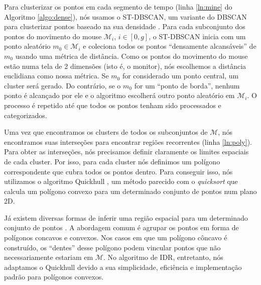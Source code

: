 Para clusterizar os pontos em cada segmento de tempo (linha \ref{ln:mine} do Algoritmo \ref{algo:dense}), nós usamos o ST-DBSCAN, um variante do DBSCAN para clusterizar pontos baseado na sua densidade \cite{Birant:2007}. Para cada subconjunto dos pontos do movimento do mouse $\mathcal{M}_i$, $i \in [0,g]$, o ST-DBSCAN inicia com um ponto aleatório $m_0 \in \mathcal{M}_i$ e coleciona todos os pontos ``densamente alcansáveis'' de $m_0$ usando uma métrica de distância. Como os pontos do movimento do mouse estão numa tela de 2 dimensões (isto é, o monitor), nós escolhemos a distância euclidiana como nossa métrica. Se $m_0$ for considerado um ponto central,  um cluster será gerado. Do contrário, se o $m_0$ for um ``ponto de borda'', nenhum ponto é alcançado por ele e o algoritmo escolherá outro ponto aleatório em $\mathcal{M}_i$. O processo é repetido até que todos os pontos tenham sido processados e categorizados.

Uma vez que encontramos os clusters de todos os subconjuntos de $\mathcal{M}$, nós encontramos suas interseções para encontrar regiões recorrentes (linha \ref{ln:poly}). Para obter as interseções, nós precisamos definir claramente os limites espaciais de cada cluster. Por isso, para cada cluster nós definimos um polígono correspondente que cubra todos os pontos dentro. Para conseguir isso, nós utilizamos o algoritmo Quickhull \cite{Barber:1996}, um método parecido com o \textit{quicksort} que calcula um polígono convexo para um determinado conjunto de pontos num plano 2D.

Já existem diversas formas de inferir uma região espacial para um determinado conjunto de pontos \cite{Bevis1989,DUCKHAM2008,FADILI2004,ARAMPATZIS2006,Galton2006}. A abordagem comum é agrupar os pontos em forma de polígonos concavos e convexos. Nos casos em que um polígono côncavo é construído, os ``dentes'' desse polígono podem vincular pontos que não necessariamente estariam em $\mathcal{M}$. No algoritmo de IDR, entretanto, nós adaptamos o Quickhull devido a sua simplicidade, eficiência e implementação padrão para polígonos convexos.